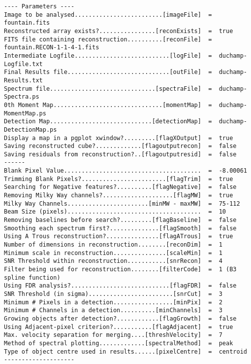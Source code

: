{\scriptsize
\begin{verbatim}
---- Parameters ----
Image to be analysed.........................[imageFile]  =  fountain.fits
Reconstructed array exists?................[reconExists]  =  true
FITS file containing reconstruction..........[reconFile]  =  fountain.RECON-1-1-4-1.fits
Intermediate Logfile...........................[logFile]  =  duchamp-Logfile.txt
Final Results file.............................[outFile]  =  duchamp-Results.txt
Spectrum file..............................[spectraFile]  =  duchamp-Spectra.ps
0th Moment Map...............................[momentMap]  =  duchamp-MomentMap.ps
Detection Map.............................[detectionMap]  =  duchamp-DetectionMap.ps
Display a map in a pgplot xwindow?.........[flagXOutput]  =  true
Saving reconstructed cube?.............[flagoutputrecon]  =  false
Saving residuals from reconstruction?..[flagoutputresid]  =  false
------
Blank Pixel Value.......................................  =  -8.00061
Trimming Blank Pixels?........................[flagTrim]  =  true
Searching for Negative features?..........[flagNegative]  =  false
Removing Milky Way channels?....................[flagMW]  =  true
Milky Way Channels.......................[minMW - maxMW]  =  75-112
Beam Size (pixels)......................................  =  10
Removing baselines before search?.........[flagBaseline]  =  false
Smoothing each spectrum first?..............[flagSmooth]  =  false
Using A Trous reconstruction?...............[flagATrous]  =  true
Number of dimensions in reconstruction........[reconDim]  =  1
Minimum scale in reconstruction...............[scaleMin]  =  1
SNR Threshold within reconstruction...........[snrRecon]  =  4
Filter being used for reconstruction........[filterCode]  =  1 (B3 spline function)
Using FDR analysis?............................[flagFDR]  =  false
SNR Threshold (in sigma)........................[snrCut]  =  3
Minimum # Pixels in a detection.................[minPix]  =  2
Minimum # Channels in a detection..........[minChannels]  =  3
Growing objects after detection?............[flagGrowth]  =  false
Using Adjacent-pixel criterion?...........[flagAdjacent]  =  true
Max. velocity separation for merging....[threshVelocity]  =  7
Method of spectral plotting.............[spectralMethod]  =  peak
Type of object centre used in results......[pixelCentre]  =  centroid
--------------------
\end{verbatim}
}
